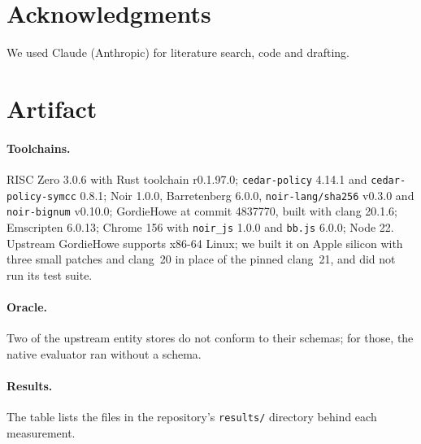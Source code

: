 \documentclass[11pt]{article}
\begin{document}
\section*{Acknowledgments}

We used Claude (Anthropic) for literature search, code and drafting.

\appendix

\section{Artifact}
\label{app:artifact}

\paragraph{Toolchains.} RISC Zero 3.0.6 with Rust toolchain r0.1.97.0; \texttt{cedar-policy} 4.14.1 and \texttt{cedar-policy-symcc} 0.8.1; Noir 1.0.0, Barretenberg 6.0.0, \texttt{noir-lang/sha256} v0.3.0 and \texttt{noir-bignum} v0.10.0; GordieHowe at commit 4837770, built with clang 20.1.6; Emscripten 6.0.13; Chrome 156 with \texttt{noir\_js} 1.0.0 and \texttt{bb.js} 6.0.0; Node 22. Upstream GordieHowe supports x86-64 Linux; we built it on Apple silicon with three small patches and clang~20 in place of the pinned clang~21, and did not run its test suite.

\paragraph{Oracle.} Two of the upstream entity stores do not conform to their schemas; for those, the native evaluator ran without a schema.

\paragraph{Results.} The table lists the files in the repository's \texttt{results/} directory behind each measurement.
\end{document}
